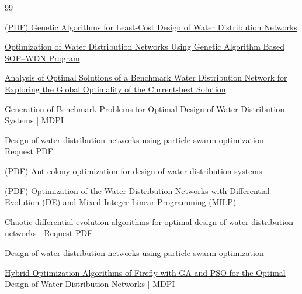 \documentclass[12pt, a4paper]{article}
\begin{document}
\begin{thebibliography}{99}

	 \href{https://www.researchgate.net/publication/235694770_Genetic_Algorithms_for_Least-Cost_Design_of_Water_Distribution_Networks}{(PDF) Genetic Algorithms for Least-Cost Design of Water Distribution Networks}

	 \href{https://www.mdpi.com/2073-4441/14/6/851}{Optimization of Water Distribution Networks Using Genetic Algorithm Based SOP--WDN Program}

	 \href{https://chijournal.org/H527}{Analysis of Optimal Solutions of a Benchmark Water Distribution Network for Exploring the Global Optimality of the Current-best Solution}

	 \href{https://www.mdpi.com/2073-4441/11/8/1637}{Generation of Benchmark Problems for Optimal Design of Water Distribution Systems | MDPI}

	 \href{https://www.researchgate.net/publication/263555074_Design_of_water_distribution_networks_using_particle_swarm_optimization}{Design of water distribution networks using particle swarm optimization | Request PDF}

	 \href{https://www.researchgate.net/publication/270396349_Ant_colony_optimization_for_design_of_water_distribution_systems}{(PDF) Ant colony optimization for design of water distribution systems}

	 \href{https://www.researchgate.net/publication/280095752_Optimization_of_the_Water_Distribution_Networks_with_Differential_Evolution_DE_and_Mixed_Integer_Linear_Programming_MILP}{(PDF) Optimization of the Water Distribution Networks with Differential Evolution (DE) and Mixed Integer Linear Programming (MILP)}

	 \href{https://www.researchgate.net/publication/364837949_Chaotic_differential_evolution_algorithms_for_optimal_design_of_water_distribution_networks}{Chaotic differential evolution algorithms for optimal design of water distribution networks | Request PDF}

	 \href{https://www.researchgate.net/publication/263555074_Design_of_water_distribution_networks_using_particle_swarm_optimization}{Design of water distribution networks using particle swarm optimization}

	 \href{https://www.mdpi.com/2073-4441/15/10/1906}{Hybrid Optimization Algorithms of Firefly with GA and PSO for the Optimal Design of Water Distribution Networks | MDPI}


\end{thebibliography}
\end{document}
